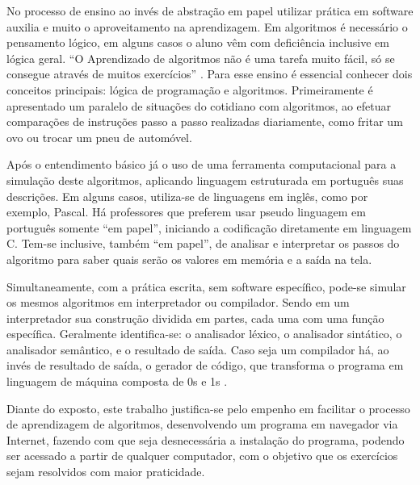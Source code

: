 No processo de ensino ao invés de abstração em papel utilizar prática em software auxilia e muito o aproveitamento na aprendizagem. Em algoritmos é necessário o pensamento lógico, em alguns casos o aluno vêm com deficiência inclusive em lógica geral. ``O Aprendizado de algoritmos não é uma tarefa muito fácil, só se consegue através de muitos exercícios'' \cite[p.~1]{lopes2002etal}. Para esse ensino é essencial conhecer dois conceitos principais: lógica de programação e algoritmos. Primeiramente é apresentado um paralelo de situações do cotidiano com algoritmos, ao efetuar comparações de instruções passo a passo realizadas diariamente, como fritar um ovo ou trocar um pneu de automóvel.

Após o entendimento básico já o uso de uma ferramenta computacional para a simulação deste algoritmos, aplicando linguagem estruturada em português suas descrições. Em alguns casos, utiliza-se de linguagens em inglês, como por exemplo, Pascal. Há professores que preferem usar pseudo linguagem em português somente ``em papel'', iniciando a codificação diretamente em linguagem C. Tem-se inclusive, também ``em papel'', de analisar e interpretar os passos do algoritmo para saber quais serão os valores em memória e a saída na tela.

Simultaneamente, com a prática escrita, sem software específico, pode-se simular os mesmos algoritmos em interpretador ou compilador. Sendo em um interpretador sua construção dividida em partes, cada uma com uma função específica. Geralmente identifica-se: o analisador léxico, o analisador sintático, o analisador semântico, e o resultado de saída. Caso seja um compilador há, ao invés de resultado de saída, o gerador de código, que transforma o programa em linguagem de máquina composta de 0s e 1s \cite{delamaro2004}.

Diante do exposto, este trabalho justifica-se pelo empenho em facilitar o processo de aprendizagem de algoritmos, desenvolvendo um programa em navegador via Internet, fazendo com que seja desnecessária a instalação do programa,  podendo ser acessado a partir de qualquer computador, com o objetivo que os exercícios sejam resolvidos com maior praticidade.\color{black}
